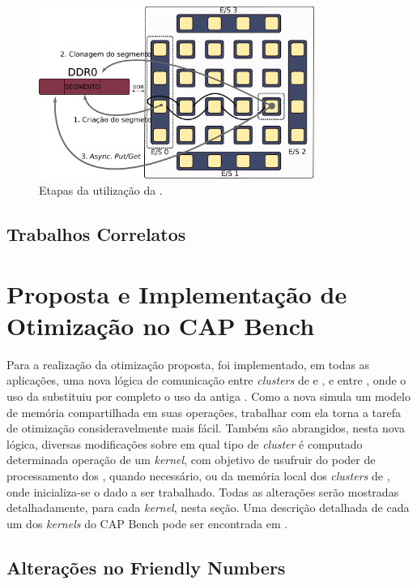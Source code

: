 \documentclass[a4paper,11pt]{article}
\newcommand{\capb}{CAP Bench\xspace}
\begin{document}
\begin{figure}[h]
\centering
\includegraphics[width=9cm, keepaspectratio]{figs/putget.pdf}
\caption{Etapas da utilização da \api \async.}\par
\label{fig:asyncOverview}
\end{figure}


\subsection{Trabalhos Correlatos}

\section{Proposta e Implementação de Otimização no \capb}
\label{sec:capbMPPA}

Para a realização da otimização proposta, foi implementado, em todas as aplicações, uma nova lógica de comunicação entre \textit{clusters} de \io e \ccs, e entre \ccs, onde o uso da \async substituiu por completo o uso da antiga \ipc. Como a nova \api simula um modelo de memória compartilhada em suas operações, trabalhar com ela torna a tarefa de otimização consideravelmente mais fácil. Também são abrangidos, nesta nova lógica, diversas modificações sobre em qual tipo de \textit{cluster} é computado determinada operação de um \textit{kernel}, com objetivo de usufruir do poder de processamento dos \ccs, quando necessário, ou da memória local dos \textit{clusters} de \io, onde inicializa-se o dado a ser trabalhado. Todas as alterações serão mostradas detalhadamente, para cada \textit{kernel}, nesta seção. Uma descrição detalhada de cada um dos \textit{kernels} do \capb pode ser encontrada em \cite{Castro-Souza-CCPE:2016}.

\subsection{Alterações no Friendly Numbers}
\end{document}
